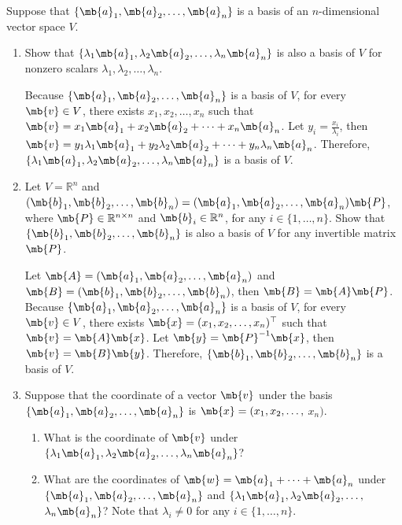 \newpage
\begin{exercise}
	Suppose that $\{\mb{a}_1, \mb{a}_2,\dots,\mb{a}_n\}$ is a basis of an $n$-dimensional vector space $V$.
	\begin{enumerate}
		\item Show that $\{\lambda_1 \mb{a}_1, \lambda_2 \mb{a}_2, \dots, \lambda_n\mb{a}_n\}$ is also a basis of $V$ for nonzero scalars $\lambda_1,\lambda_2, \dots, \lambda_n$.

			\begin{solution}
				Because $\{\mb{a}_1, \mb{a}_2,\dots,\mb{a}_n\}$ is a basis of $V$, for every $\mb{v} \in V$, there exists $x_1, x_2, \dots, x_n$ such that $\mb{v} = x_1 \mb{a}_1 + x_2 \mb{a}_2 + \dots + x_n \mb{a}_n$.
				Let $y_i = \frac{x_i}{\lambda_i}$, then $\mb{v} = y_1 \lambda_1 \mb{a}_1 + y_2 \lambda_2 \mb{a}_2 + \dots + y_n \lambda_n \mb{a}_n$.
				Therefore, $\{\lambda_1 \mb{a}_1, \lambda_2 \mb{a}_2, \dots, \lambda_n\mb{a}_n\}$ is a basis of $V$.
				\qedhere
			\end{solution}

		\item Let $V =\mathbb{R}^n$ and  $(\mb{b}_1,\mb{b}_2,\dots, \mb{b}_n) = (\mb{a}_1,\mb{a}_2, \dots, \mb{a}_n)\mb{P}$, where $\mb{P}\in \mathbb{R}^{n\times n}$ and $\mb{b}_i\in \mathbb{R}^n$, for any $i\in\{1,\dots,n\}$. Show that $\{ \mb{b}_1, \mb{b}_2, \dots, \mb{b}_n\}$ is also a basis of $V$ for any invertible  matrix $\mb{P}$.

			\begin{solution}
				Let $\mb{A} = (\mb{a}_1, \mb{a}_2, \dots, \mb{a}_n)$ and $\mb{B} = (\mb{b}_1, \mb{b}_2, \dots, \mb{b}_n)$, then $\mb{B} = \mb{A}\mb{P}$.
				Because $\{\mb{a}_1, \mb{a}_2,\dots,\mb{a}_n\}$ is a basis of $V$, for every $\mb{v} \in V$, there exists $\mb{x} = (x_1, x_2, \dots, x_n)^\top$ such that $\mb{v} = \mb{A} \mb{x}$.
				Let $\mb{y} = \mb{P}^{-1} \mb{x}$, then $\mb{v} = \mb{B} \mb{y}$.
				Therefore, $\{ \mb{b}_1, \mb{b}_2, \dots, \mb{b}_n\}$ is a basis of $V$.
				\qedhere
			\end{solution}

		\item Suppose that the coordinate of a vector $\mb{v}$ under the basis $\{\mb{a}_1,  \mb{a}_2,\dots,\mb{a}_n\}$ is $\mb{x}=(x_1,x_2,\dots,$ $ x_n)$.
			\begin{enumerate}
				\item What is the coordinate of $\mb{v}$ under $\{\lambda_1 \mb{a}_1, \lambda_2 \mb{a}_2, \dots, \lambda_n\mb{a}_n\}$?
				\item What are the coordinates of $\mb{w} = \mb{a}_1+\dots + \mb{a}_n$ under $\{\mb{a}_1, \mb{a}_2,\dots,\mb{a}_n\}$ and $\{\lambda_1 \mb{a}_1, \lambda_2 \mb{a}_2, \dots, $ $\lambda_n\mb{a}_n\}$? Note that  $\lambda_i \neq 0$ for any $i\in \{1,\dots,n\}$.
			\end{enumerate}


\end{enumerate}
\end{exercise}
